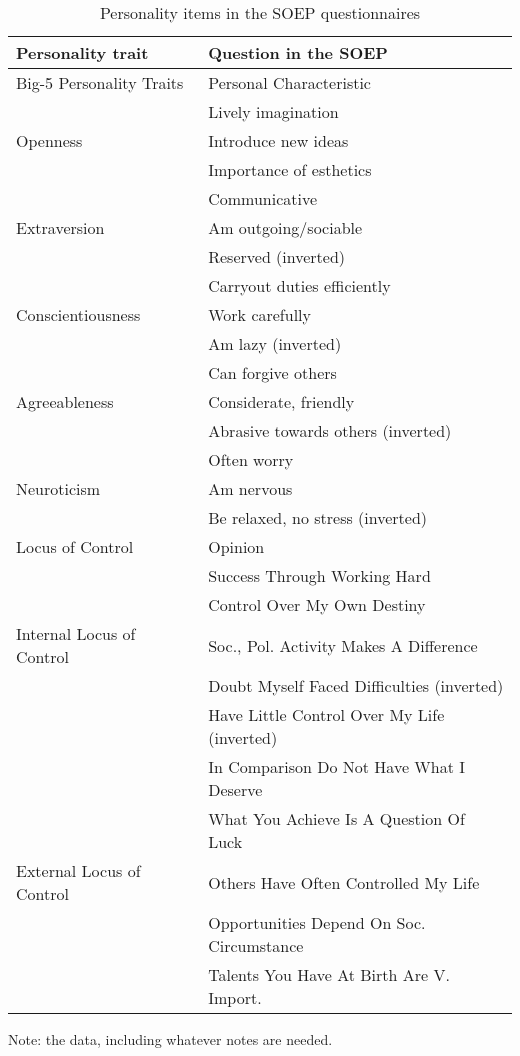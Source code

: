 \documentclass[%
    a4paper,            %
    11pt,               %
    bibliography=totoc, %
]
{scrartcl}
\begin{document}
\begin{table}[htp!]
	\small
	\centering
	\begin{threeparttable}
		\caption{Personality items in the SOEP questionnaires}
		\begin{tabular}{@{}ll@{}}
			\toprule
			Personality trait & Question in the SOEP \\ \midrule
			Big-5 Personality Traits & Personal Characteristic \\ \midrule
			& Lively imagination \\
			Openness & Introduce new ideas \\
			& Importance of esthetics \\ \midrule
			& Communicative \\
			Extraversion & Am outgoing/sociable \\
			& Reserved (inverted) \\ \midrule
			& Carryout duties efficiently \\
			Conscientiousness & Work carefully \\
			& Am lazy (inverted) \\ \midrule
			& Can forgive others \\
			Agreeableness & Considerate, friendly \\
			& Abrasive towards others (inverted) \\ \midrule
			& Often worry \\ 
			Neuroticism & Am nervous \\
			& Be relaxed, no stress (inverted) \\ \midrule
			Locus of Control & Opinion \\ \midrule
			& Success Through Working Hard \\
			& Control Over My Own Destiny \\
			Internal Locus of Control & Soc., Pol. Activity Makes A Difference \\
			& Doubt Myself Faced Difficulties (inverted) \\
			& Have Little Control Over My Life (inverted) \\ \midrule
			& In Comparison Do Not Have What I Deserve \\
			& What You Achieve Is A Question Of Luck \\
			External Locus of Control & Others Have Often Controlled My Life \\
			& Opportunities Depend On Soc. Circumstance \\
			& Talents You Have At Birth Are V. Import. \\ \bottomrule
		\end{tabular}
		\begin{tablenotes}[flushleft]
			\footnotesize
			\item 
			Note:
			the data, including whatever notes are needed.
		\end{tablenotes}
	\end{threeparttable}
\end{table}
\end{document}
